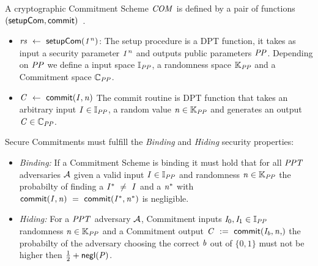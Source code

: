\begin{definition}\label{def:pre:commitment}
    A cryptographic Commitment Scheme $\mathit{COM}$ is defined by a pair of functions $(\mathsf{setupCom}, \mathsf{commit})$~\cite{bunz2018bulletproofs}.
    \begin{itemize}
        \item $\mathit{rs} ~\leftarrow~ \mathsf{setupCom} (\mathit{1^n})$: The setup procedure is a DPT function, it takes as input a security parameter $\mathit{1^n}$ and outputs public parameters $\mathit{PP}$.
        Depending on $\mathit{PP}$ we define a input space $\mathbb{I}_{\mathit{PP}}$, a randomness space $\mathbb{K}_{\mathit{PP}}$ and a Commitment space $\mathbb{C}_{\mathit{PP}}$.
        \item $\mathit{C} ~\leftarrow~ \mathsf{commit}(\mathit{I}, \mathit{n})$ The commit routine is DPT function that takes an arbitrary input $\mathit{I} \in \mathbb{I}_{\mathit{PP}}$, a random value $\mathit{n} \in \mathbb{K}_{\mathit{PP}}$ and
        generates an output $\mathit{C} \in \mathbb{C}_{\mathit{PP}}$.
    \end{itemize}

    Secure Commitments must fulfill the \emph{Binding} and \emph{Hiding} security properties:
    \begin{itemize}
        \item \textit{Binding:} If a Commitment Scheme is binding it must hold that for all $\mathit{PPT}$ adversaries $\mathcal{A}$ given a valid input $\mathit{I} \in \mathbb{I}_{\mathit{PP}}$
        and randomness $\mathit{n} \in \mathbb{K}_{\mathit{PP}}$ the probabilty of finding a $\mathit{I}^* ~\neq~ \mathit{I}$ and a $\mathit{n}^*$ with
        $\mathsf{commit}(\mathit{I}, \mathit{n}) ~=~ \mathsf{commit}(\mathit{I}^*, \mathit{n}^*)$ is negligible.
        \item \textit{Hiding:} For a $\mathit{PPT}$ adversary $\mathcal{A}$, Commitment inputs $\mathit{I}_0, \mathit{I}_1 \in \mathbb{I}_{\mathit{PP}}$ randomness $\mathit{n} \in
       \mathbb{K}_{\mathit{PP}}$ and a Commitment output $\varCommitment \opAssign \procCommit{\varInput_{\varB}, \varNonce}$ the probabilty of the adversary choosing the correct $\mathit{b}$ out of $\{0,1\}$
        must not be higher then $\frac{1}{2} + \mathsf{negl}(\mathit{P})$.
    \end{itemize}
\end{definition}

